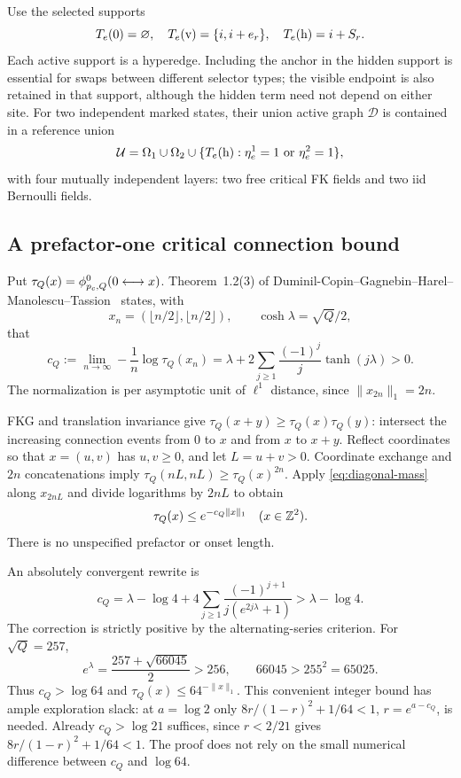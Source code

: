 Use the selected supports
\begin{equation}\label{eq:selected-supports}
 T_e(0)=\varnothing,\quad T_e({\rm v})=\{i,i+e_r\},\quad
 T_e({\rm h})=i+S_r.
\end{equation}
Each active support is a hyperedge. Including the anchor in the hidden support is essential for swaps between different selector types; the visible endpoint is also retained in that support, although the hidden term need not depend on either site. For two independent marked states, their union active graph $\mathcal D$ is contained in a reference union
\begin{equation}\label{eq:four-layers}
 \mathcal U=\Omega_1\cup\Omega_2
       \cup\{T_e({\rm h}):\eta_e^1=1\text{ or }\eta_e^2=1\},
\end{equation}
with four mutually independent layers: two free critical FK fields and two iid Bernoulli fields.

\subsection{A prefactor-one critical connection bound}\label{sec:full-mass}
Put $\tau_Q(x)=\phi^0_{p_c,Q}(0\longleftrightarrow x)$. Theorem~1.2(3) of Duminil-Copin--Gagnebin--Harel--Manolescu--Tassion~\cite{DGHMT} states, with
\[
 x_n=(\lfloor n/2\rfloor,\lfloor n/2\rfloor),\qquad
 \cosh\lambda=\sqrt Q/2,
\]
that
\begin{equation}\label{eq:diagonal-mass}
 c_Q:=\lim_{n\to\infty}-\frac1n\log\tau_Q(x_n)
 =\lambda+2\sum_{j\ge1}\frac{(-1)^j}{j}\tanh(j\lambda)>0.
\end{equation}
The normalization is per asymptotic unit of $\ell^1$ distance, since $\|x_{2n}\|_1=2n$.

FKG and translation invariance give
$\tau_Q(x+y)\ge\tau_Q(x)\tau_Q(y)$: intersect the increasing connection events from $0$ to $x$ and from $x$ to $x+y$. Reflect coordinates so that $x=(u,v)$ has $u,v\ge0$, and let $L=u+v>0$. Coordinate exchange and $2n$ concatenations imply
$\tau_Q(nL,nL)\ge\tau_Q(x)^{2n}$.
Apply \eqref{eq:diagonal-mass} along $x_{2nL}$ and divide logarithms by $2nL$ to obtain
\begin{equation}\label{eq:pointwise-mass}
 \tau_Q(x)\le e^{-c_Q\|x\|_1}\quad(x\in\mathbb Z^2).
\end{equation}
There is no unspecified prefactor or onset length.

An absolutely convergent rewrite is
\begin{equation}\label{eq:mass-rewrite}
 c_Q=\lambda-\log4+
 4\sum_{j\ge1}\frac{(-1)^{j+1}}{j(e^{2j\lambda}+1)}
 >\lambda-\log4.
\end{equation}
The correction is strictly positive by the alternating-series criterion. For $\sqrt Q=257$,
\[
 e^\lambda=\frac{257+\sqrt{66045}}2>256,
 \qquad 66045>255^2=65025.
\]
Thus $c_Q>\log64$ and $\tau_Q(x)\le64^{-\|x\|_1}$. This convenient integer bound has ample exploration slack: at $a=\log2$ only
$8r/(1-r)^2+1/64<1$, $r=e^{a-c_Q}$, is needed. Already $c_Q>\log21$ suffices, since $r<2/21$ gives $8r/(1-r)^2+1/64<1$. The proof does not rely on the small numerical difference between $c_Q$ and $\log64$.

